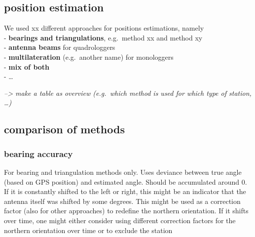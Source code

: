 \documentclass[
  letterpaper,
  DIV=11,
  numbers=noendperiod]{scrartcl}
\begin{document}
\hypertarget{position-estimation}{%
\subsection{position estimation}\label{position-estimation}}

We used xx different approaches for positions estimations, namely\\
- \textbf{bearings and triangulations}, e.g.~method xx and method xy\\
- \textbf{antenna beams} for quadrologgers\\
- \textbf{multilateration} (e.g.~another name) for monologgers\\
- \textbf{mix of both}\\
- \ldots{}

\emph{--\textgreater{} make a table as overview (e.g.~which method is
used for which type of station, \ldots)}

\hypertarget{comparison-of-methods}{%
\subsection{comparison of methods}\label{comparison-of-methods}}

\hypertarget{bearing-accuracy}{%
\subsubsection{bearing accuracy}\label{bearing-accuracy}}

For bearing and triangulation methods only. Uses deviance between true
angle (based on GPS position) and estimated angle. Should be accumulated
around 0. If it is constantly shifted to the left or right, this might
be an indicator that the antenna itself was shifted by some degrees.
This might be used as a correction factor (also for other approaches) to
redefine the northern orientation. If it shifts over time, one might
either consider using different correction factors for the northern
orientation over time or to exclude the station
\end{document}
